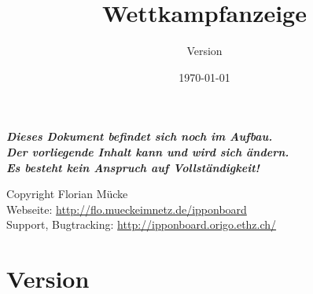 ﻿\documentclass[11pt,numbers=noenddot]{scrreprt}
\title{{\IB} Wettkampfanzeige}
\subtitle{Version \IBVersion}
\date{\today}
\begin{document}
\maketitle

\thispagestyle{empty}

\vspace*{\fill}

{\centering\bfseries\itshape\LARGE
Dieses Dokument befindet sich noch im Aufbau.\\
Der vorliegende Inhalt kann und wird sich ändern.\\
Es besteht kein Anspruch auf Vollständigkeit! \par}

\vspace*{\fill}

\begin{center}
{%
Copyright  Florian Mücke \\
Webseite: \url{http://flo.mueckeimnetz.de/ipponboard} \\
Support, Bugtracking: \url{http://ipponboard.origo.ethz.ch/}}
\end{center}


\renewcommand\contentsname{Inhalt}
\tableofcontents

\chapter{Version}
\end{document}
